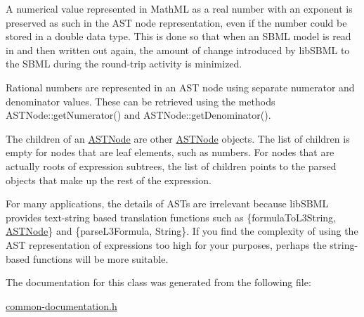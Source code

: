 \begin{DoxyItemize}
\item A numerical value represented in Math\+ML as a real number with an exponent is preserved as such in the A\+ST node representation, even if the number could be stored in a {\ttfamily double} data type. This is done so that when an S\+B\+ML model is read in and then written out again, the amount of change introduced by lib\+S\+B\+ML to the S\+B\+ML during the round-\/trip activity is minimized.\end{DoxyItemize}
\begin{DoxyItemize}
\item Rational numbers are represented in an A\+ST node using separate numerator and denominator values. These can be retrieved using the methods A\+S\+T\+Node\+::get\+Numerator() and A\+S\+T\+Node\+::get\+Denominator().\end{DoxyItemize}
\begin{DoxyItemize}
\item The children of an \hyperlink{class_a_s_t_node}{A\+S\+T\+Node} are other \hyperlink{class_a_s_t_node}{A\+S\+T\+Node} objects. The list of children is empty for nodes that are leaf elements, such as numbers. For nodes that are actually roots of expression subtrees, the list of children points to the parsed objects that make up the rest of the expression.\end{DoxyItemize}
For many applications, the details of A\+S\+Ts are irrelevant because lib\+S\+B\+ML provides text-\/string based translation functions such as \{formula\+To\+L3\+String, \hyperlink{class_a_s_t_node}{A\+S\+T\+Node}\} and \{parse\+L3\+Formula, String\}. If you find the complexity of using the A\+ST representation of expressions too high for your purposes, perhaps the string-\/based functions will be more suitable. 

The documentation for this class was generated from the following file\+:\begin{DoxyCompactItemize}
\item 
\hyperlink{common-documentation_8h}{common-\/documentation.\+h}\end{DoxyCompactItemize}
